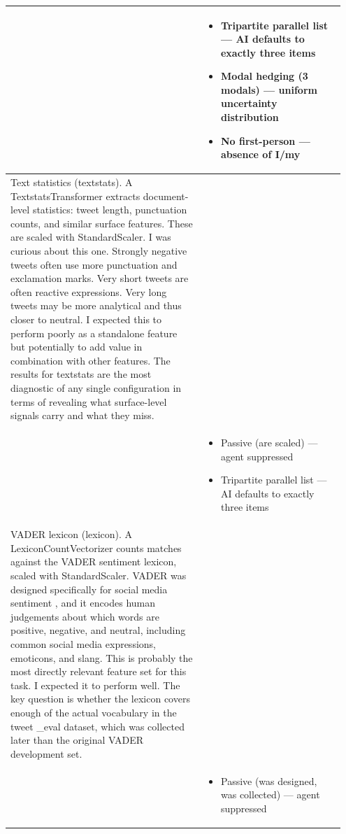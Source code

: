 \documentclass[11pt]{article}
\begin{document}
\begin{longtable}{|p{0.55\linewidth}|p{0.40\linewidth}|}
\hline
\rule[-3.5cm]{0pt}{3.5cm} & \begin{itemize}[leftmargin=1em,itemsep=1pt,topsep=1pt,parsep=0pt]
  \item Tripartite parallel list --- AI defaults to exactly three items
  \item Modal hedging (3 modals) --- uniform uncertainty distribution
  \item No first-person --- absence of I/my
\end{itemize} \\
\hline
Text statistics (textstats). A TextstatsTransformer extracts document-level statistics: tweet length, punctuation counts, and similar surface features. These are scaled with StandardScaler. I was curious about this one. Strongly negative tweets often use more punctuation and exclamation marks. Very short tweets are often reactive expressions. Very long tweets may be more analytical and thus closer to neutral. I expected this to perform poorly as a standalone feature but potentially to add value in combination with other features. The results for textstats are the most diagnostic of any single configuration in terms of revealing what surface-level signals carry and what they miss. & \\[2pt]
\hline
\rule[-3.5cm]{0pt}{3.5cm} & \begin{itemize}[leftmargin=1em,itemsep=1pt,topsep=1pt,parsep=0pt]
  \item Passive (are scaled) --- agent suppressed
  \item Tripartite parallel list --- AI defaults to exactly three items
\end{itemize} \\
\hline
VADER lexicon (lexicon). A LexiconCountVectorizer counts matches against the VADER sentiment lexicon, scaled with StandardScaler. VADER was designed specifically for social media sentiment , and it encodes human judgements about which words are positive, negative, and neutral, including common social media expressions, emoticons, and slang. This is probably the most directly relevant feature set for this task. I expected it to perform well. The key question is whether the lexicon covers enough of the actual vocabulary in the tweet \_eval dataset, which was collected later than the original VADER development set. & \\[2pt]
\hline
\rule[-3.5cm]{0pt}{3.5cm} & \begin{itemize}[leftmargin=1em,itemsep=1pt,topsep=1pt,parsep=0pt]
  \item Passive (was designed, was collected) --- agent suppressed

\end{itemize}
\end{longtable}
\end{document}
